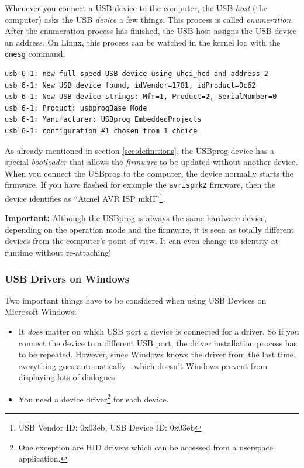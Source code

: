 \documentclass[bibtotoc,UKenglish,halfparskip,oneside,DIV12]{scrreprt}
\begin{document}
Whenever you connect a USB device to the computer, the USB \emph{host} (the computer) asks the USB
\emph{device} a few things. This process is called \emph{enumeration}. After the enumeration process
has finished, the USB host assigns the USB device an address. On Linux, this process can be watched
in the kernel log with the \texttt{dmesg} command:

\begin{lstlisting}[style=inline]
usb 6-1: new full speed USB device using uhci_hcd and address 2
usb 6-1: New USB device found, idVendor=1781, idProduct=0c62
usb 6-1: New USB device strings: Mfr=1, Product=2, SerialNumber=0
usb 6-1: Product: usbprogBase Mode
usb 6-1: Manufacturer: USBprog EmbeddedProjects
usb 6-1: configuration #1 chosen from 1 choice
\end{lstlisting}

As already mentioned in section \vref{sec:definitions}, the USBprog device has a special
\emph{bootloader} that allows the \emph{firmware} to be updated without another device.
When you connect the USBprog to the computer, the device normally starts the firmware.
If you have flashed for example the \texttt{avrispmk2} firmware, then the device identifies as
``Atmel AVR ISP mkII''\footnote{USB Vendor ID: 0x03eb, USB Device ID: 0x03eb}.

\textbf{Important:} Although the USBprog is always the same hardware device, depending on the
operation mode and the firmware, it is seen as totally different devices from the computer's point
of view. It can even change its identity at runtime without re-attaching!

\subsubsection{USB Drivers on Windows}

Two important things have to be considered when using USB Devices on Microsoft Windows:

\begin{itemize}
  \item It \emph{does} matter on which USB port a device is connected for a driver. So if you
    connect the device to a different USB port, the driver installation process has to be repeated.
    However, since Windows knows the driver from the last time, everything goes
    automatically---which doesn't Windows prevent from displaying lots of dialogues.

  \item You need a device driver\footnote{One exception are HID drivers which can be accessed from a
    userspace application.} for each device.
\end{itemize}
\end{document}
